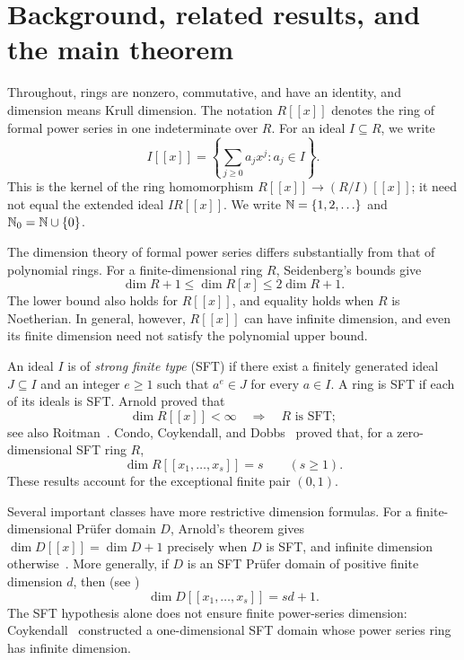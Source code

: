 \section{Background, related results, and the main theorem}
\label{sec:introduction}

Throughout, rings are nonzero, commutative, and have an identity,
and dimension means Krull dimension. The notation $R[[x]]$ denotes
the ring of formal power series in one indeterminate over $R$.
For an ideal $I\subseteq R$, we write
\[
 I[[x]]=\left\{\sum_{j\ge0}a_jx^j:a_j\in I\right\}.
\]
This is the kernel of the ring homomorphism $R[[x]]\longrightarrow(R/I)[[x]]$; it need not
equal the extended ideal $IR[[x]]$. We write $\mathbb N=\{1,2,\ldots\}$
and $\mathbb N_0=\mathbb N\cup\{0\}$.

The dimension theory of formal power series differs substantially
from that of polynomial rings. For a finite-dimensional ring $R$,
Seidenberg's bounds \cite{Seidenberg1953} give
\[
 \dim R+1\le\dim R[x]\le2\dim R+1.
\]
The lower bound also holds for $R[[x]]$, and equality holds when $R$
is Noetherian. In general, however, $R[[x]]$ can have infinite
dimension, and even its finite dimension need not satisfy the
polynomial upper bound.

An ideal $I$ is of \emph{strong finite type} (SFT) if there exist a
finitely generated ideal $J\subseteq I$ and an integer $e\ge1$ such
that $a^e\in J$ for every $a\in I$. A ring is SFT if each of its
ideals is SFT. Arnold \cite{Arnold1973a} proved that
\begin{equation}\label{eq:arnold}
 \dim R[[x]]<\infty\quad\Longrightarrow\quad R\text{ is SFT};
\end{equation}
see also Roitman~\cite{Roitman2015}. Condo, Coykendall, and
Dobbs~\cite[Corollary~2.2]{CondoCoykendallDobbs1996} proved that,
for a zero-dimensional SFT ring $R$,
\begin{equation}\label{eq:zero-classical}
 \dim R[[x_1,\ldots,x_s]]=s\qquad(s\ge1).
\end{equation}
These results account for the exceptional finite pair $(0,1)$.

Several important classes have more restrictive dimension formulas.
For a finite-dimensional Pr\"ufer domain $D$, Arnold's theorem
gives $\dim D[[x]]=\dim D+1$ precisely when $D$ is SFT, and
infinite dimension otherwise~\cite[Theorem~3.8]{Arnold1973b}.
More generally, if $D$ is an SFT Pr\"ufer domain of positive finite
dimension $d$, then (see \cite[Theorem~3.6]{Arnold1982})
\[
 \dim D[[x_1,\ldots,x_s]]=sd+1.
\]
The SFT hypothesis alone does not ensure finite power-series
dimension: Coykendall~\cite{Coykendall2002} constructed a
one-dimensional SFT domain whose power series ring has infinite
dimension.

